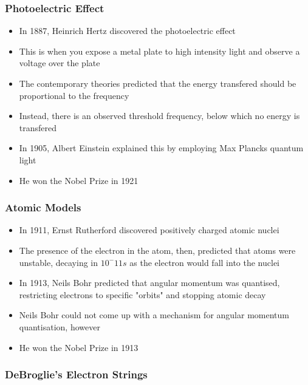 \documentclass{article}
\begin{document}
\subsubsection*{Photoelectric Effect}

\begin{itemize}
    \item In 1887, Heinrich Hertz discovered the photoelectric effect
    \item This is when you expose a metal plate to high intensity light and observe a voltage over the plate
    \item The contemporary theories predicted that the energy transfered should be proportional to the frequency
    \item Instead, there is an observed threshold frequency, below which no energy is transfered
    \item In 1905, Albert Einstein explained this by employing Max Plancks quantum light
    \item He won the Nobel Prize in 1921
\end{itemize}

\subsubsection*{Atomic Models}

\begin{itemize}
    \item In 1911, Ernst Rutherford discovered positively charged atomic nuclei
    \item The presence of the electron in the atom, then, predicted that atoms were unstable, decaying in $10^-11 s$ as the electron would fall into the nuclei 
    \item In 1913, Neils Bohr predicted that angular momentum was quantised, restricting electrons to specific "orbits" and stopping atomic decay
    \item Neils Bohr could not come up with a mechanism for angular momentum quantisation, however
    \item He won the Nobel Prize in 1913
\end{itemize}

\subsubsection*{DeBroglie's Electron Strings}
\end{document}

